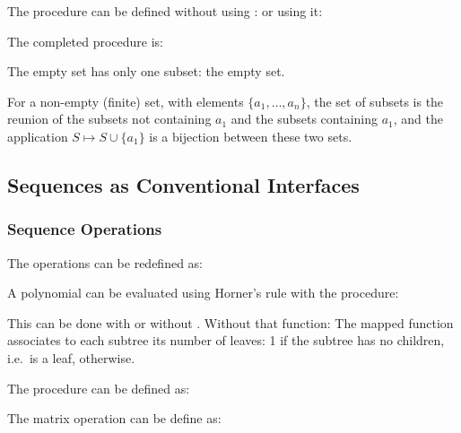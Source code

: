 \begin{exe}[2.31]
    The procedure  can be defined without using :
    or using it:
\end{exe}

\begin{exe}[2.32]
    The completed procedure is:

    The empty set has only one subset: the empty set.

    For a non-empty (finite) set, with elements $\{a_1, …, a_n\}$, the set of 
    subsets is the reunion of the subsets not containing $a_1$ and the subsets 
    containing $a_1$, and the application $S \mapsto S \cup \{a_1\}$ is 
    a bijection between these two sets.
\end{exe}

\subsection{Sequences as Conventional Interfaces}
\label{2.2.3}

\subsubsection{Sequence Operations}

\begin{exe}[2.33]
    The operations can be redefined as:
\end{exe}

\begin{exe}[2.34]
    A polynomial can be evaluated using Horner’s rule with the procedure:
\end{exe}

\begin{exe}[2.35]
    This can be done with or without . Without that function:
    The mapped function associates to each subtree its number of leaves: 1 if 
    the subtree has no children, i.e.\ is a leaf,  
    otherwise.
\end{exe}

\begin{exe}[2.36]
    The procedure  can be defined as:
\end{exe}

\begin{exe}[2.37]
    The matrix operation can be define as:
\end{exe}

